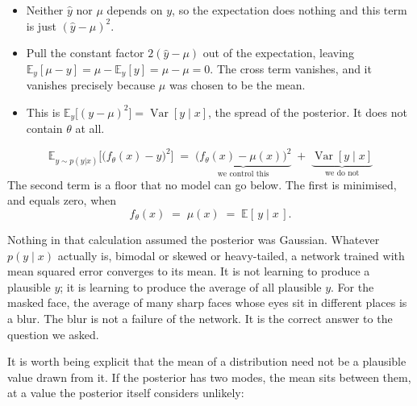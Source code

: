 \documentclass[11pt]{article}
\newcommand{\yhat}{\hat{y}}
\begin{document}
\begin{itemize}
  \item[(i)] Neither $\yhat$ nor $\mu$ depends on $y$, so the expectation does nothing and
  this term is just $(\yhat - \mu)^{2}$.
  \item[(ii)] Pull the constant factor $2(\yhat - \mu)$ out of the expectation, leaving
  $\mathbb{E}_{y}[\mu - y] = \mu - \mathbb{E}_{y}[y] = \mu - \mu = 0$. The cross term
  vanishes, and it vanishes precisely because $\mu$ was chosen to be the mean.
  \item[(iii)] This is $\mathbb{E}_{y}\big[(y - \mu)^{2}\big] = \operatorname{Var}[y \mid x]$,
  the spread of the posterior. It does not contain $\theta$ at all.
\end{itemize}

\begin{keybox}
\[
  \mathbb{E}_{y \sim p(y|x)}\Big[\big(f_\theta(x) - y\big)^{2}\Big]
  \;=\;
  \underbrace{\big(f_\theta(x) - \mu(x)\big)^{2}}_{\text{we control this}}
  \;+\;
  \underbrace{\operatorname{Var}[y \mid x]}_{\text{we do not}}
\]
The second term is a floor that no model can go below. The first is minimised, and equals
zero, when
\[
  f_\theta(x) \;=\; \mu(x) \;=\; \mathbb{E}[\,y \mid x\,].
\]
\end{keybox}

\noindent
Nothing in that calculation assumed the posterior was Gaussian. Whatever $p(y \mid x)$
actually is, bimodal or skewed or heavy-tailed, a network trained with mean squared error
converges to its mean. It is not learning to produce a plausible $y$; it is learning to
produce the average of all plausible $y$. For the masked face, the average of many sharp
faces whose eyes sit in different places is a blur. The blur is not a failure of the
network. It is the correct answer to the question we asked.

\medskip
\noindent
It is worth being explicit that the mean of a distribution need not be a plausible value
drawn from it. If the posterior has two modes, the mean sits between them, at a value the
posterior itself considers unlikely:

\begin{center}
\end{center}
\end{document}
